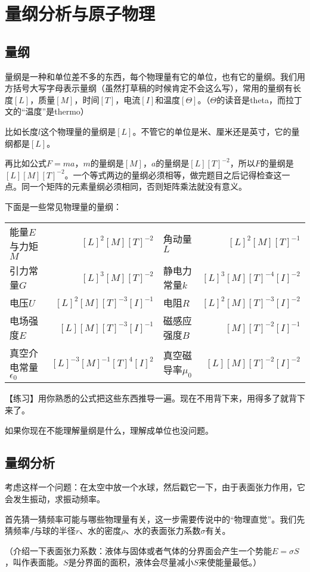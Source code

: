 \chapter{量纲分析与原子物理}
\section{量纲}
量纲是一种和单位差不多的东西，每个物理量有它的单位，也有它的量纲。我们用方括号大写字母表示量纲（虽然打草稿的时候肯定不会这么写），常用的量纲有长度$[L]$，质量$[M]$，时间$[T]$，电流$[I]$和温度$[\Theta]$。（$\Theta$的读音是theta，而拉丁文的“温度”是thermo）

比如长度$l$这个物理量的量纲是$[L]$。不管它的单位是米、厘米还是英寸，它的量纲都是$[L]$。

再比如公式$F=m a$，$m$的量纲是$[M]$，$a$的量纲是$[L] [T]^{-2}$，所以$F$的量纲是$[L] [M] [T]^{-2}$。一个等式两边的量纲必须相等，做完题目之后记得检查这一点。同一个矩阵的元素量纲必须相同，否则矩阵乘法就没有意义。

下面是一些常见物理量的量纲：

\begin{tabular}{lrlr}
能量$E$与力矩$M$ & $[L]^2 [M] [T]^{-2}$ & 角动量$L$ & $[L]^2 [M] [T]^{-1}$ \\
引力常量$G$ & $[L]^3 [M] [T]^{-2}$ & 静电力常量$k$ & $[L]^3 [M] [T]^{-4} [I]^{-2}$ \\
电压$U$ & $[L]^2 [M] [T]^{-3} [I]^{-1}$ & 电阻$R$ & $[L]^2 [M] [T]^{-3} [I]^{-2}$ \\
电场强度$E$ & $[L] [M] [T]^{-3} [I]^{-1}$ & 磁感应强度$B$ & $[M] [T]^{-2} [I]^{-1}$ \\
真空介电常量$\epsilon_0$ & $[L]^{-3} [M]^{-1} [T]^4 [I]^2$ & 真空磁导率$\mu_0$ & $[L] [M] [T]^{-2} [I]^{-2}$
\end{tabular}

【练习】用你熟悉的公式把这些东西推导一遍。现在不用背下来，用得多了就背下来了。

如果你现在不能理解量纲是什么，理解成单位也没问题。
\section{量纲分析}
考虑这样一个问题：在太空中放一个水球，然后戳它一下，由于表面张力作用，它会发生振动，求振动频率。

首先猜一猜频率可能与哪些物理量有关，这一步需要传说中的“物理直觉”。我们先猜频率$f$与球的半径$r$、水的密度$\rho$、水的表面张力系数$\sigma$有关。

（介绍一下表面张力系数：液体与固体或者气体的分界面会产生一个势能$E=\sigma S$，叫作表面能。$S$是分界面的面积，液体会尽量减小$S$来使能量最低。）

